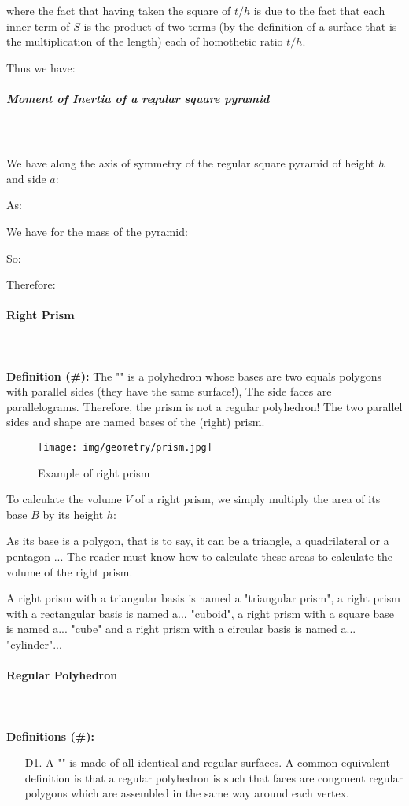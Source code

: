 {	where the fact that having taken the square of $t/h$ is due to the fact that each inner term of $S$ is the product of two terms (by the definition of a surface that is the multiplication of the length) each of homothetic ratio $t / h$.
	
	Thus we have:
	
	
	\subparagraph{Moment of Inertia of a regular square pyramid}\mbox{}\\\\
	We have along the axis of symmetry of the regular square pyramid of height $h$ and side $a$:
	
	As:
	
	We have for the mass of the pyramid:
	
	So:
	
	Therefore:
	
	
	\paragraph{Right Prism}\mbox{}\\\\
	\textbf{Definition (\#\mydef):} The "" is a polyhedron whose bases are two equals polygons with parallel sides (they have the same surface!), The side faces are parallelograms. Therefore, the prism is not a regular polyhedron! The two parallel sides and shape are named bases of the (right) prism.
	\begin{figure}[H]
		\centering
		\texttt{[image: img/geometry/prism.jpg]}
		\caption{Example of right prism}
	\end{figure}
	To calculate the volume $V$ of a right prism, we simply multiply the area of its base $B$ by its height $h$:
	
	As its base is a polygon, that is to say, it can be a triangle, a quadrilateral or a pentagon ... The reader must know how to calculate these areas to calculate the volume of the right prism.
	
	A right prism with a triangular basis is named a "triangular prism", a right prism with a rectangular basis is named a... "cuboid", a right prism with a square base is named a... "cube" and a right prism with a circular basis is named a... "cylinder"...
	
	\paragraph{Regular Polyhedron}\mbox{}\\\\
	\textbf{Definitions (\#\mydef):}
	\begin{enumerate}
		\item[D1.] A "" is made of all identical and regular surfaces. A common equivalent definition is that a regular polyhedron is such that faces are congruent regular polygons which are assembled in the same way around each vertex.
		

\end{enumerate}}
